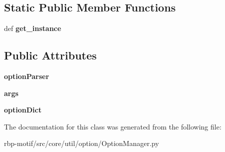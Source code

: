 \subsection*{Static Public Member Functions}
\begin{DoxyCompactItemize}
\item 
\hypertarget{classsrc_1_1core_1_1util_1_1option_1_1OptionManager_1_1OptionManager_a583ac242007654ceeefd34c0dfa6e456}{def {\bfseries get\-\_\-instance}}\label{classsrc_1_1core_1_1util_1_1option_1_1OptionManager_1_1OptionManager_a583ac242007654ceeefd34c0dfa6e456}

\end{DoxyCompactItemize}
\subsection*{Public Attributes}
\begin{DoxyCompactItemize}
\item 
\hypertarget{classsrc_1_1core_1_1util_1_1option_1_1OptionManager_1_1OptionManager_a41b9222b8b55921e5a7b20635304a43b}{{\bfseries option\-Parser}}\label{classsrc_1_1core_1_1util_1_1option_1_1OptionManager_1_1OptionManager_a41b9222b8b55921e5a7b20635304a43b}

\item 
\hypertarget{classsrc_1_1core_1_1util_1_1option_1_1OptionManager_1_1OptionManager_a1e5e8bf5f9e1ccb3a60af497d6c48f4c}{{\bfseries args}}\label{classsrc_1_1core_1_1util_1_1option_1_1OptionManager_1_1OptionManager_a1e5e8bf5f9e1ccb3a60af497d6c48f4c}

\item 
\hypertarget{classsrc_1_1core_1_1util_1_1option_1_1OptionManager_1_1OptionManager_a79ef2291fe97ccf1515234eb257873a0}{{\bfseries option\-Dict}}\label{classsrc_1_1core_1_1util_1_1option_1_1OptionManager_1_1OptionManager_a79ef2291fe97ccf1515234eb257873a0}

\end{DoxyCompactItemize}


The documentation for this class was generated from the following file\-:\begin{DoxyCompactItemize}
\item 
rbp-\/motif/src/core/util/option/Option\-Manager.\-py\end{DoxyCompactItemize}
